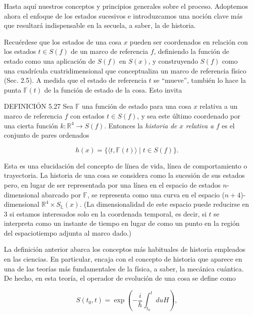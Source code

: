 \begin{justifying}
    Hasta aquí nuestros conceptos y principios generales sobre el proceso. Adoptemos ahora el enfoque de los estados sucesivos e introduzcamos una 
    noción clave más que resultará indispensable en la secuela, a saber, la de historia.

    Recuérdese que los estados de una cosa $x$ pueden ser coordenados en relación 
    con los estados $t \in S(f)$ de un marco de referencia $f$, definiendo la 
    función de estado como una aplicación de $S(f)$ en $S(x)$, y construyendo 
    $S(f)$ como una cuadrícula cuatridimensional que conceptualiza un marco de 
    referencia físico (Sec. 2.5). A medida que el estado de referencia $t$ se 
    ``mueve'', también lo hace la punta $\mathbb{F}(t)$ de la función de estado de la cosa. 
    Esto invita

    \bigskip

    \noindent DEFINICIÓN 5.27 Sea $\mathbb{F}$ una función de estado para 
    una cosa $x$ relativa a un marco de referencia $f$ con estados $t \in S(f)$, 
    y sea este último coordenado por una cierta función $k: \mathbb{R}^4 \to S(f)$. 
    Entonces la \textit{historia de $x$ relativa a $f$} es el conjunto de pares 
    ordenados

    \[
        h(x) = \{\langle t, \mathbb{F}(t) \rangle \mid t \in S(f)\}.
    \]

    Esta es una elucidación del concepto de línea de vida, línea de comportamiento 
    o trayectoria. La historia de una cosa se considera como la sucesión de sus 
    estados pero, en lugar de ser representada por una línea en el espacio de 
    estados $n$-dimensional abarcado por $\mathbb{F}$, se representa como una 
    curva en el espacio ($n+4$)-dimensional $\mathbb{R}^4 \times S_\mathbb{L}(x)$. 
    (La dimensionalidad de este espacio puede reducirse en 3 si estamos interesados 
    solo en la coordenada temporal, es decir, si $t$ se interpreta como un instante 
    de tiempo en lugar de como un punto en la región del espaciotiempo adjunta al 
    marco dado.)

    La definición anterior abarca los conceptos más habituales de historia empleados 
    en las ciencias. En particular, encaja con el concepto de historia que aparece en 
    una de las teorías más fundamentales de la física, a saber, la mecánica cuántica. 
    De hecho, en esta teoría, el operador de evolución de una cosa se define como

    \[
        S(t_0, t) = \exp\left(-\frac{i}{\hbar}\int_{t_0}^{t} du H\right),
    \]


\end{justifying}
